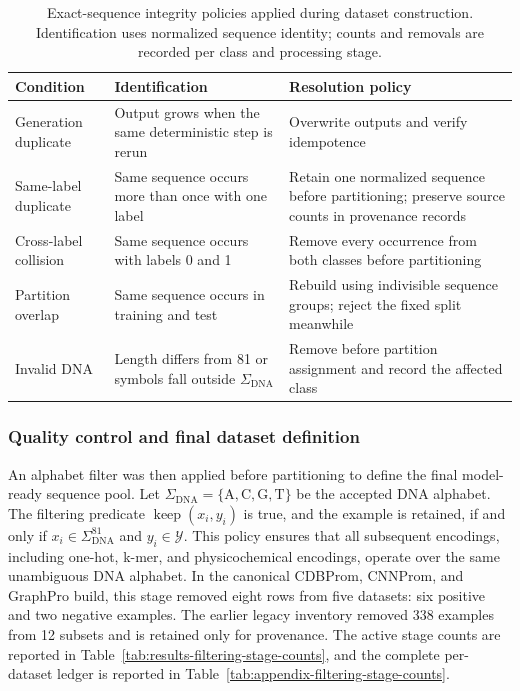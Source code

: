 \begin{table}[htbp]
\centering
\caption{Exact-sequence integrity policies applied during dataset construction. Identification uses normalized sequence identity; counts and removals are recorded per class and processing stage.}
\label{tab:sequence-integrity-policies}
\begin{tabular}{p{}p{}p{}}
\toprule
Condition & Identification & Resolution policy \\
\midrule
Generation duplicate & Output grows when the same deterministic step is rerun & Overwrite outputs and verify idempotence \\
Same-label duplicate & Same sequence occurs more than once with one label & Retain one normalized sequence before partitioning; preserve source counts in provenance records \\
Cross-label collision & Same sequence occurs with labels 0 and 1 & Remove every occurrence from both classes before partitioning \\
Partition overlap & Same sequence occurs in training and test & Rebuild using indivisible sequence groups; reject the fixed split meanwhile \\
Invalid DNA & Length differs from 81 or symbols fall outside $\Sigma_{\mathrm{DNA}}$ & Remove before partition assignment and record the affected class \\
\bottomrule
\end{tabular}
\end{table}

\subsubsection{Quality control and final dataset definition}

An alphabet filter was then applied before partitioning to define the final
model-ready sequence pool. Let $\Sigma_{\mathrm{DNA}}=\{\mathrm{A},\mathrm{C},\mathrm{G},\mathrm{T}\}$ be the accepted DNA
alphabet. The filtering predicate $\operatorname{keep}(x_i,y_i)$ is true, and the example
is retained, if and only if $x_i\in\Sigma_{\mathrm{DNA}}^{81}$ and
$y_i\in\mathcal{Y}$. This policy ensures that all
subsequent encodings, including one-hot, k-mer, and physicochemical encodings,
operate over the same unambiguous DNA alphabet. In the canonical CDBProm,
CNNProm, and GraphPro build, this stage removed eight rows from five datasets:
six positive and two negative examples. The earlier legacy inventory removed
338 examples from 12 subsets and is retained only for provenance. The active
stage counts are reported in Table~\ref{tab:results-filtering-stage-counts}, and
the complete per-dataset ledger is reported in
Table~\ref{tab:appendix-filtering-stage-counts}.

